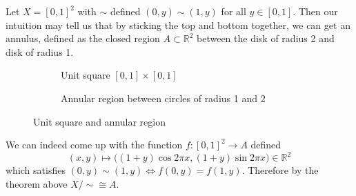   \begin{example}[Annulus]
    Let $X = [0, 1]^2$ with $\sim$ defined $(0, y) \sim (1, y)$ for all $y \in [0, 1]$. Then our intuition may tell us that by sticking the top and bottom together, we can get an annulus, defined as the closed region $A \subset \mathbb{R}^2$ between the disk of radius 2 and disk of radius 1. 

    \begin{figure}[H]
      \centering
      \begin{subfigure}[b]{0.48\textwidth}
        \centering
        \caption{Unit square $[0,1] \times [0,1]$}
        \label{fig:unit-square}
      \end{subfigure}
      \hfill 
      \begin{subfigure}[b]{0.48\textwidth}
        \centering
        \caption{Annular region between circles of radius 1 and 2}
        \label{fig:annular-region}
      \end{subfigure}
      \caption{Unit square and annular region}
      \label{fig:annular_comparison}
    \end{figure} 

    We can indeed come up with the function $f:[0, 1]^2 \rightarrow A$ defined 
    \begin{equation}
      (x, y) \mapsto \big( (1 + y) \cos{2 \pi x}, (1 + y) \sin{2 \pi x} \big) \in \mathbb{R}^2
    \end{equation}
    which satisfies $(0, y) \sim (1, y) \iff f(0, y) = f(1, y)$. Therefore by the theorem above $X/{\sim} \cong A$. 
  \end{example}

